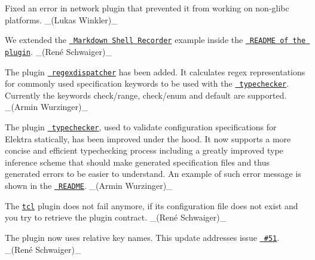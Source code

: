 \begin{DoxyItemize}
\item Fixed an error in network plugin that prevented it from working on non-\/glibc platforms. \+\_\+(\+Lukas Winkler)\+\_\+
\end{DoxyItemize}


\begin{DoxyItemize}
\item We extended the \href{https://master.libelektra.org/tests/shell/shell_recorder/tutorial_wrapper}{\texttt{ Markdown Shell Recorder}} example inside the \href{https://www.libelektra.org/plugins/type}{\texttt{ R\+E\+A\+D\+ME of the plugin}}. \+\_\+(René Schwaiger)\+\_\+
\end{DoxyItemize}


\begin{DoxyItemize}
\item The plugin \href{https://www.libelektra.org/plugins/regexdispatcher}{\texttt{ regexdispatcher}} has been added. It calculates regex representations for commonly used specification keywords to be used with the \href{https://www.libelektra.org/plugins/typechecker}{\texttt{ typechecker}}. Currently the keywords {\ttfamily check/range}, {\ttfamily check/enum} and {\ttfamily default} are supported. \+\_\+(\+Armin Wurzinger)\+\_\+
\end{DoxyItemize}


\begin{DoxyItemize}
\item The plugin \href{https://www.libelektra.org/plugins/typechecker}{\texttt{ typechecker}}, used to validate configuration specifications for Elektra statically, has been improved under the hood. It now supports a more concise and efficient typechecking process including a greatly improved type inference scheme that should make generated specification files and thus generated errors to be easier to understand. An example of such error message is shown in the \href{https://www.libelektra.org/plugins/typechecker}{\texttt{ R\+E\+A\+D\+ME}}. \+\_\+(\+Armin Wurzinger)\+\_\+
\end{DoxyItemize}


\begin{DoxyItemize}
\item The \href{http://libelektra.org/plugins/tcl}{\texttt{ {\ttfamily tcl}}} plugin does not fail anymore, if its configuration file does not exist and you try to retrieve the plugin contract. \+\_\+(René Schwaiger)\+\_\+
\item The plugin now uses relative key names. This update addresses issue \href{https://issues.libelektra.org/51}{\texttt{ \#51}}. \+\_\+(René Schwaiger)\+\_\+
\end{DoxyItemize}



